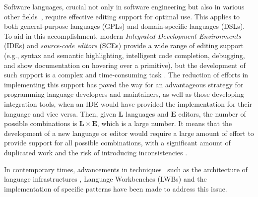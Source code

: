 Software languages, crucial not only in software engineering but also in various other fields~\cite{Paulin93, Colmerauer90}, require effective editing support for optimal use.
This applies to both general-purpose languages (GPLs) and domain-specific languages (DSLs).
To aid in this accomplishment, modern \textit{Integrated Development Environments} (IDEs) and \textit{source-code editors} (SCEs) provide a wide range of editing support (e.g., syntax and semantic highlighting, intelligent code completion, debugging, and show documentation on hovering over a primitive), but the development of such support is a complex and time-consuming task \cite{Rodriguez-Echeverria18}.
The reduction of efforts in implementing this support has paved the way for an advantageous strategy for programming language developers and maintainers, as well as those developing integration tools, when an IDE would have provided the implementation for their language and vice versa.
Then, given $\mathbf{L}$ languages and $\mathbf{E}$ editors, the number of possible combinations is $\mathbf{L} \times \mathbf{E}$, which is a large number.
It means that the development of a new language or editor would require a large amount of effort to provide support for all possible combinations, with a significant amount of duplicated work and the risk of introducing inconsistencies \cite{Rask21}.

In contemporary times, advancements in techniques~\cite{Rask21a} such as the architecture of language infrastructures \cite{Lammel18, Voelter13}, Language Workbenches (LWBs) \cite{Erdweg13b} and the implementation of specific patterns \cite{Basten15, Mernik05, Parr09} have been made to address this issue.

